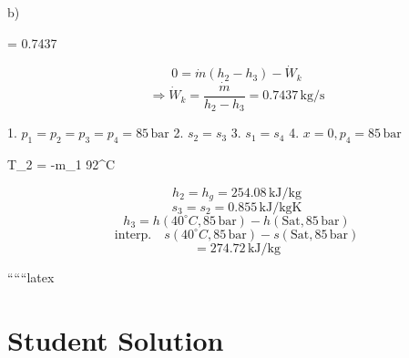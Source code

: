 b)

  = 0.7437 \, 

\[
0 = \dot{m}(h_2 - h_3) - \dot{W}_k
\]
\[
\Rightarrow \dot{W}_k = \frac{\dot{m}}{h_2 - h_3} = 0.7437 \, \text{kg/s}
\]

1. \( p_1 = p_2 = p_3 = p_4 = 85 \, \text{bar} \)
2. \( s_2 = s_3 \)
3. \( s_1 = s_4 \)
4. \( x = 0, p_4 = 85 \, \text{bar} \)

 \quad T_2 = -m_1 92^\circ C \quad {}

\[
h_2 = h_g = 254.08 \, \text{kJ/kg}
\]
\[
s_3 = s_2 = 0.855 \, \text{kJ/kgK}
\]
\[
h_3 = h(40^\circ C, 85 \, \text{bar}) - h(\text{Sat}, 85 \, \text{bar})
\]
\[
\text{interp.} \quad s(40^\circ C, 85 \, \text{bar}) - s(\text{Sat}, 85 \, \text{bar})
\]
\[
= 274.72 \, \text{kJ/kg}
\]

``````latex


\section*{Student Solution}